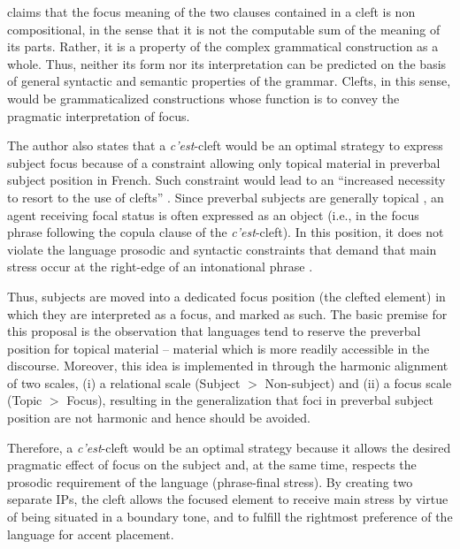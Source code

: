 \textcite{lambrecht1996information} claims that the focus meaning of the two clauses contained in a cleft is non compositional, in the sense that it is not the computable sum of the meaning of its parts. Rather, it is a property of the complex grammatical construction as a whole. Thus, neither its form nor its interpretation can be predicted on the basis of general syntactic and semantic properties of the grammar. Clefts, in this sense, would be grammaticalized constructions whose function is to convey the pragmatic interpretation of focus. 

The author also states that a \textit{c’est}-cleft would be an optimal strategy to express subject focus because of a constraint allowing only topical material in preverbal subject position in French. Such constraint would lead to an “increased necessity to resort to the use of clefts” \parencite[490]{lambrecht2001framework}. Since preverbal subjects are generally topical \parencite{chafe1976givenness, keenan1976foregrounding}, an agent receiving focal status is often expressed as an object (i.e., in the focus phrase following the copula clause of the \textit{c’est}-cleft). In this position, it does not violate the language prosodic and syntactic constraints that demand that main stress occur at the right-edge of an intonational phrase \parencite{jun2000phonological}. 

Thus, subjects are moved into a dedicated focus position (the clefted element) in which they are interpreted as a focus, and marked as such. The basic premise for this proposal is the observation that languages tend to reserve the preverbal position for topical material – material which is more readily accessible in the discourse. Moreover, this idea is implemented in \textcite{aissen1999markedness} through the harmonic alignment of two scales, (i) a relational scale (Subject $>$ Non-subject) and (ii) a focus scale (Topic $>$ Focus), resulting in the generalization that foci in preverbal subject position are not harmonic and hence should be avoided. 

Therefore, a \textit{c’est}-cleft would be an optimal strategy because it allows the desired pragmatic effect of focus on the subject and, at the same time, respects the prosodic requirement of the language (phrase-final stress).
By creating two separate IPs, the cleft allows the  focused  element  to  receive  main  stress by virtue of being situated in a boundary tone, and  to  fulfill  the  rightmost  preference  of the language for accent placement. 

